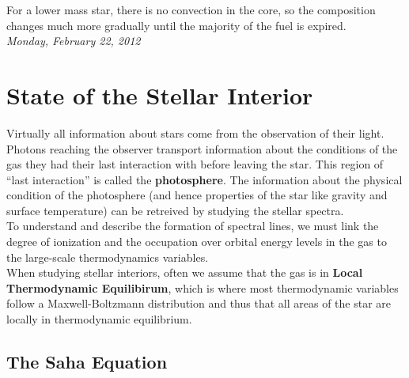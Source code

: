 \documentclass[10pt]{article}
\numberwithin{equation}{section}
\newcommand{\n}{\noindent}
\begin{document}
    \n For a lower mass star, there is no convection in the core, so
    the composition changes much more gradually until the majority of
    the fuel is expired.\\

    \n \textit{Monday, February 22, 2012}

    \section{State of the Stellar Interior}
    \label{sec:state-stell-inter}

    Virtually all information about stars come from the observation of
    their light. Photons reaching the observer transport information
    about the conditions of the gas they had their last interaction
    with before leaving the star. This region of ``last interaction''
    is called the \textbf{photosphere}. The information about the
    physical condition of the photosphere (and hence properties of the
    star like gravity and surface temperature) can be retreived by
    studying the stellar spectra.\\

    \n To understand and describe the formation of spectral lines, we
    must link the degree of ionization and the occupation over orbital
    energy levels in the gas to the large-scale thermodynamics
    variables. \\

    \n When studying stellar interiors, often we assume that the gas is
    in \textbf{Local Thermodynamic Equilibirum}, which is where most
    thermodynamic variables follow a Maxwell-Boltzmann distribution
    and thus that all areas of the star are locally in thermodynamic
    equilibrium.

    \subsection{The Saha Equation}
    \label{sec:saha-equation}
 
\end{document}
